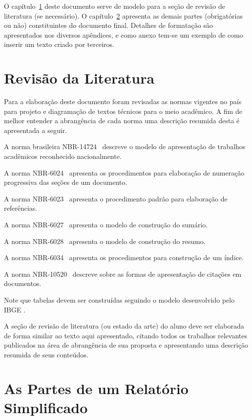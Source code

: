 \documentclass[repeatfields,xlists,xpacks,oneside,yearsonly]{ufrgscca}
\begin{document}
    O capítulo~\ref{revisao} deste documento serve de modelo para a seção de
revisão de literatura (se necessário). O capítulo~\ref{partes} apresenta
as demais partes (obrigatórias ou não) constituintes do documento final.
Detalhes de formatação são apresentados nos diversos apêndices, e como anexo tem-se um exemplo de como inserir um texto criado por terceiros.

\chapter{Revisão da Literatura}
\label{revisao}

Para a elaboração deste documento foram revisadas as normas vigentes no país
para projeto e diagramação de textos técnicos para o meio acadêmico. A fim
de melhor entender a abrangência de cada norma uma descrição resumida desta
é apresentada a seguir.

A norma brasileira NBR-14724~\cite{ABNT:NBR-14724-2011} descreve o modelo de
apresentação de trabalhos acadêmicos reconhecido nacionalmente.

A norma NBR-6024~\cite{ABNT:NBR-6024-2003}  apresenta os procedimentos para
elaboração de numeração progressiva das seções de um documento.

A norma  NBR-6023~\cite{ABNT:NBR-6023-2002} apresenta o procedimento padrão
para elaboração de referências.

A norma NBR-6027~\cite{ABNT:NBR-6027-2003} apresenta o modelo de construção do sumário.

A norma NBR-6028~\cite{ABNT:NBR-6028-2003} apresenta o modelo de construção do resumo.

A norma NBR-6034~\cite{ABNT:NBR-6034-2004} apresenta os procedimentos para construção de um índice.

A norma NBR-10520~\cite{ABNT:NBR-10520-2002} descreve sobre as
formas de apresentação de citações em documentos.


Note que tabelas devem ser construídas seguindo o modelo desenvolvido pelo IBGE \cite{IBGE:tabular-1993}.


A seção de revisão de literatura (ou estado da arte) do aluno deve ser
elaborada de forma similar ao texto aqui apresentado, citando todos os
trabalhos relevantes publicados na área de abrangência de sua proposta e
apresentando uma descrição resumida de seus conteúdos.

\chapter{As Partes de um Relatório Simplificado}
\label{partes}
\end{document}
